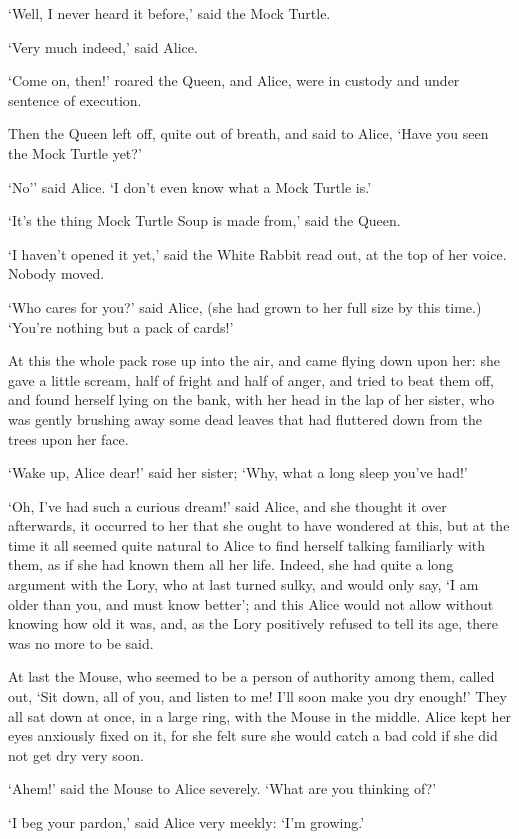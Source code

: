 \documentclass[statementpaper,twoside,openany]{memoir}
\begin{document}
`Well, I never heard it before,' said the Mock Turtle.

`Very much indeed,' said Alice.

`Come on, then!' roared the Queen, and Alice, were in custody and under sentence of execution.

Then the Queen left off, quite out of breath, and said to Alice, `Have you seen the Mock Turtle yet?'

`No'' said Alice. `I don't even know what a Mock Turtle is.'

`It's the thing Mock Turtle Soup is made from,' said the Queen.

`I haven't opened it yet,' said the White Rabbit read out, at the top of her voice. Nobody moved.

`Who cares for you?' said Alice, (she had grown to her full size by this time.) `You're nothing but a pack of cards!'

At this the whole pack rose up into the air, and came flying down upon her: she gave a little scream, half of fright and half of anger, and tried to beat them off, and found herself lying on the bank, with her head in the lap of her sister, who was gently brushing away some dead leaves that had fluttered down from the trees upon her face.

`Wake up, Alice dear!' said her sister; `Why, what a long sleep you've had!'

`Oh, I've had such a curious dream!' said Alice, and she thought it over afterwards, it occurred to her that she ought to have wondered at this, but at the time it all seemed quite natural to Alice to find herself talking familiarly with them, as if she had known them all her life. Indeed, she had quite a long argument with the Lory, who at last turned sulky, and would only say, `I am older than you, and must know better'; and this Alice would not allow without knowing how old it was, and, as the Lory positively refused to tell its age, there was no more to be said.

At last the Mouse, who seemed to be a person of authority among them, called out, `Sit down, all of you, and listen to me! I'll soon make you dry enough!' They all sat down at once, in a large ring, with the Mouse in the middle. Alice kept her eyes anxiously fixed on it, for she felt sure she would catch a bad cold if she did not get dry very soon.

`Ahem!' said the Mouse to Alice severely. `What are you thinking of?'

`I beg your pardon,' said Alice very meekly: `I'm growing.'
\end{document}
